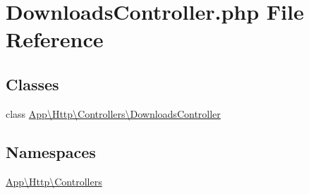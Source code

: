 \hypertarget{_downloads_controller_8php}{}\section{Downloads\+Controller.\+php File Reference}
\label{_downloads_controller_8php}
\subsection*{Classes}
\begin{DoxyCompactItemize}
\item 
class \mbox{\hyperlink{class_app_1_1_http_1_1_controllers_1_1_downloads_controller}{App\textbackslash{}\+Http\textbackslash{}\+Controllers\textbackslash{}\+Downloads\+Controller}}
\end{DoxyCompactItemize}
\subsection*{Namespaces}
\begin{DoxyCompactItemize}
\item 
 \mbox{\hyperlink{namespace_app_1_1_http_1_1_controllers}{App\textbackslash{}\+Http\textbackslash{}\+Controllers}}
\end{DoxyCompactItemize}
